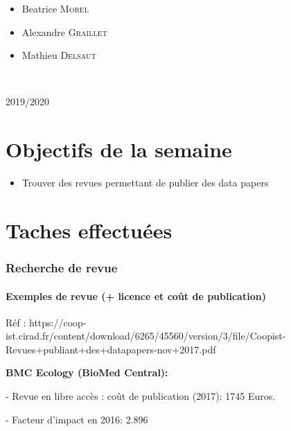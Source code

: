 \documentclass[11pt,oneside]{article}
\begin{document}
\begin{titlepage}
\begin{minipage}{0.45\textwidth}
\begin{flushright}
\begin{itemize}[font=\color{amber} \Large, label=, leftmargin=3.5cm]
\item{Beatrice \textsc{Morel}}
\item{Alexandre \textsc{Graillet}}
\item{Mathieu \textsc{Delsaut}}
\end{itemize}

\end{flushright}
\end{minipage}\\[0cm]
\vspace{10cm} 
\begin{center}
2019/2020
\end{center}
\vfill
\end{titlepage}


\newpage
\part*{Objectifs de la semaine}
\begin{itemize}
	\item Trouver des revues permettant de publier des data papers
\end{itemize}



\part*{Taches effectuées}
\section*{Recherche de revue}
\subsection*{Exemples de revue (+ licence et coût de publication)}

\begin{flushleft}
Réf : https://coop-ist.cirad.fr/content/download/6265/45560/version/3/file/Coopist-Revues+publiant+des+datapapers-nov+2017.pdf
\end{flushleft}

\begin{flushleft}
\textbf{BMC Ecology (BioMed Central):}
\end{flushleft}

-	Revue en libre accès : coût de publication (2017): 1745 Euros.

-	Facteur d'impact en 2016: 2.896
\end{document}
